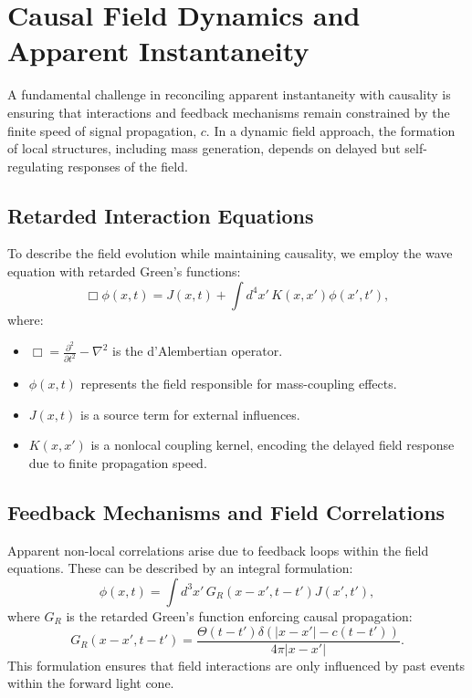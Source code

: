 \documentclass[a4paper,11pt]{article}
\begin{document}
\section{Causal Field Dynamics and Apparent Instantaneity}

A fundamental challenge in reconciling apparent instantaneity with causality is ensuring that interactions and feedback mechanisms remain constrained by the finite speed of signal propagation, $c$. In a dynamic field approach, the formation of local structures, including mass generation, depends on delayed but self-regulating responses of the field.

\subsection{Retarded Interaction Equations}
To describe the field evolution while maintaining causality, we employ the wave equation with retarded Green’s functions:
\begin{equation}
	\Box \phi(x,t) = J(x,t) + \int d^4x' \, K(x,x') \phi(x',t'),
\end{equation}
where:
\begin{itemize}
	\item $\Box = \frac{\partial^2}{\partial t^2} - \nabla^2$ is the d'Alembertian operator.
	\item $\phi(x,t)$ represents the field responsible for mass-coupling effects.
	\item $J(x,t)$ is a source term for external influences.
	\item $K(x,x')$ is a nonlocal coupling kernel, encoding the delayed field response due to finite propagation speed.
\end{itemize}

\subsection{Feedback Mechanisms and Field Correlations}
Apparent non-local correlations arise due to feedback loops within the field equations. These can be described by an integral formulation:
\begin{equation}
	\phi(x,t) = \int d^3x' \, G_R(x-x',t-t') J(x',t'),
\end{equation}
where $G_R$ is the retarded Green’s function enforcing causal propagation:
\begin{equation}
	G_R(x-x',t-t') = \frac{\Theta(t-t') \delta(|x-x'| - c(t-t'))}{4\pi |x-x'|}.
\end{equation}
This formulation ensures that field interactions are only influenced by past events within the forward light cone.
\end{document}
